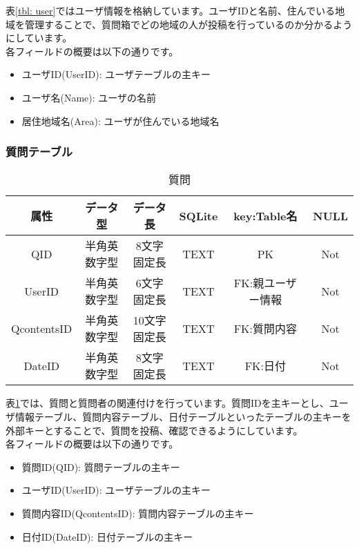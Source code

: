 \documentclass[a4j]{jarticle}
\begin{document}
表\ref{tbl: user}ではユーザ情報を格納しています。ユーザIDと名前、住んでいる地域を管理することで、質問箱でどの地域の人が投稿を行っているのか分かるようにしています。\\
各フィールドの概要は以下の通りです。
\begin{itemize}
  \item ユーザID(UserID):
  ユーザテーブルの主キー
  \item ユーザ名(Name):
  ユーザの名前
  \item 居住地域名(Area):
  ユーザが住んでいる地域名
\end{itemize}

\subsubsection{質問テーブル}

\begin{table}[H]
    \caption{質問}
    \label{tbl: question}
    \begin{center}
        \begin{tabular}{|c|c|c|c|c|c|} \hline
            属性 & データ型 & データ長 & SQLite & key:Table名 & NULL\\ \hline \hline
            QID & 半角英数字型 & 8文字固定長 & TEXT & PK & Not\\ \hline
            UserID & 半角英数字型 & 6文字固定長 & TEXT & FK:親ユーザー情報 & Not\\ \hline
            QcontentsID & 半角英数字型 & 10文字固定長 & TEXT & FK:質問内容 & Not\\ \hline
            DateID & 半角英数字型 & 8文字固定長 & TEXT & FK:日付 & Not\\ \hline
        \end{tabular}
    \end{center}
\end{table}

表\ref{tbl: question}では、質問と質問者の関連付けを行っています。質問IDを主キーとし、ユーザ情報テーブル、質問内容テーブル、日付テーブルといったテーブルの主キーを外部キーとすることで、質問を投稿、確認できるようにしています。\\
各フィールドの概要は以下の通りです。
\begin{itemize}
  \item 質問ID(QID):
  質問テーブルの主キー
  \item ユーザID(UserID):
  ユーザテーブルの主キー
  \item 質問内容ID(QcontentsID):
  質問内容テーブルの主キー
  \item 日付ID(DateID):
  日付テーブルの主キー
\end{itemize}
\end{document}
